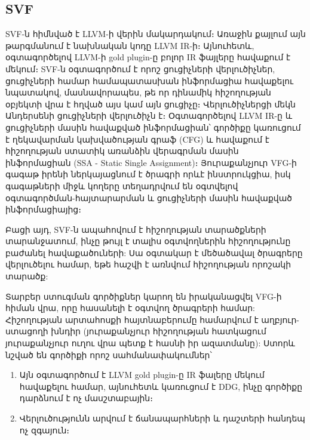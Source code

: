 \subsection{SVF}
SVF\cite{Sui2016}-ն հիմնված է LLVM-ի վերին մակարդակում։ Առաջին քայլում այն թարգմանում է նախնական կոդը LLVM IR-ի։
Այնուհետև, օգտագործելով LLVM-ի gold plugin-ը բոլոր IR ֆայլերը հավաքում է մեկում։ SVF-ն օգտագործում է որոշ ցուցիչների
վերլուծիչներ, ցուցիչների համար համապատասխան ինֆորմացիա հավաքելու նպատակով, մասնավորապես, թե որ դինամիկ հիշողության
օբյեկտի վրա է հղված այս կամ այն ցուցիչը։ Վերլուծիչներցի մեկն Անդերսենի ցուցիչների վերլուծիչն է\cite{Andersen}։
Օգտագործելով LLVM IR-ը և ցուցիչների մասին հավաքված ինֆորմացիան՝ գործիքը կառուցում է ղեկավարման կախվածության գրաֆ (CFG)
և հավաքում է հիշողության ստատիկ առանձին վերագրման մասին ինֆորմացիան (SSA - Static Single Assignment)։
Յուրաքանչյուր VFG-ի գագաթ իրենի ներկայացնում է ծրագրի որևէ ինստրուկցիա, իսկ գագաթների միջև կողերը տեղադրվում են
օգտվելով օգտագործման-հայտարարման և ցուցիչների մասին հավաքված ինֆորմացիայից։

Բացի այդ, SVF-ն ապահովում է հիշողության տարածքների տարանջատում, ինչը թույլ է տալիս օգտվողներին հիշողությունը բաժանել
հավաքածուների: Սա օգտակար է մեծածավալ ծրագրերը վերլուծելու համար, եթե հաշվի է առնվում հիշողության որոշակի տարածք:

Տարբեր ստուգման գործիքներ կարող են իրականացվել VFG-ի հիման վրա, որը հասանելի է օգտվող ծրագրերի համար:
Հիշողության արտահոսքի հայտնաբերումը համարվում է աղբյուր-ստացողի խնդիր (յուրաքանչյուր հիշողության հատկացում
յուրաքանչյուր ուղու վրա պետք է հասնի իր ազատմանը): Ստորև նշված են գործիքի որոշ սահմանափակումներ՝
\begin{enumerate}
    \item Այն օգտագործում է LLVM gold plugin-ը IR ֆալերը մեկում հավաքելու համար, այնուհետև կառուցում է DDG,
    ինչը գործիքը դարձնում է ոչ մասշտաբային։
    \item Վերլուծությունն արվում է ճանապարհների և դաշտերի հանդեպ ոչ զգայուն։
\end{enumerate}